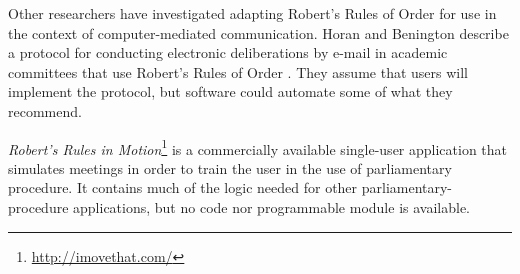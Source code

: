 \documentclass{acm_proc_article-sp}
\begin{document}
Other researchers have investigated adapting Robert's Rules of Order for use in the context of computer-mediated communication. Horan and Benington describe a protocol for conducting electronic deliberations by e-mail in academic committees that use Robert's Rules of Order \cite{horan:protocol}. They assume that users will implement the protocol, but software could automate some of what they recommend.

\emph{Robert's Rules in Motion}\footnote{\url{http://imovethat.com/}} is a commercially available single-user application that simulates meetings in order to train the user in the use of parliamentary procedure. It contains much of the logic needed for other parliamentary-procedure applications, but no code nor programmable module is available.

% 








\end{document}
